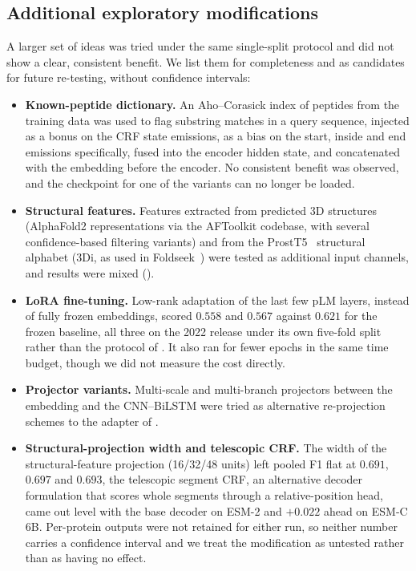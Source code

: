 \documentclass{article}
\begin{document}
\subsection{Additional exploratory modifications}

A larger set of ideas was tried under the same single-split protocol and did not show a clear, consistent benefit. We list them for completeness and as candidates for future re-testing, without confidence intervals:

\begin{itemize}
  \item \textbf{Known-peptide dictionary.} An Aho--Corasick index of peptides from the training data was used to flag substring matches in a query sequence, injected as a bonus on the CRF state emissions, as a bias on the start, inside and end emissions specifically, fused into the encoder hidden state, and concatenated with the embedding before the encoder. No consistent benefit was observed, and the checkpoint for one of the variants can no longer be loaded.
  \item \textbf{Structural features.} Features extracted from predicted 3D structures (AlphaFold2 representations via the AFToolkit codebase, with several confidence-based filtering variants) and from the ProstT5~\citep{heinzinger2023prostt5} structural alphabet (3Di, as used in Foldseek~\citep{vankempen2024foldseek}) were tested as additional input channels, and results were mixed ().
  \item \textbf{LoRA fine-tuning.} Low-rank adaptation of the last few pLM layers, instead of fully frozen embeddings, scored $0.558$ and $0.567$ against $0.621$ for the frozen baseline, all three on the 2022 release under its own five-fold split rather than the protocol of . It also ran for fewer epochs in the same time budget, though we did not measure the cost directly.
  \item \textbf{Projector variants.} Multi-scale and multi-branch projectors between the embedding and the CNN--BiLSTM were tried as alternative re-projection schemes to the adapter of .
  \item \textbf{Structural-projection width and telescopic CRF.} The width of the structural-feature projection (16/32/48 units) left pooled F1 flat at $0.691$, $0.697$ and $0.693$, the telescopic segment CRF, an alternative decoder formulation that scores whole segments through a relative-position head, came out level with the base decoder on ESM-2 and $+0.022$ ahead on ESM-C 6B. Per-protein outputs were not retained for either run, so neither number carries a confidence interval and we treat the modification as untested rather than as having no effect.
\end{itemize}
\end{document}
